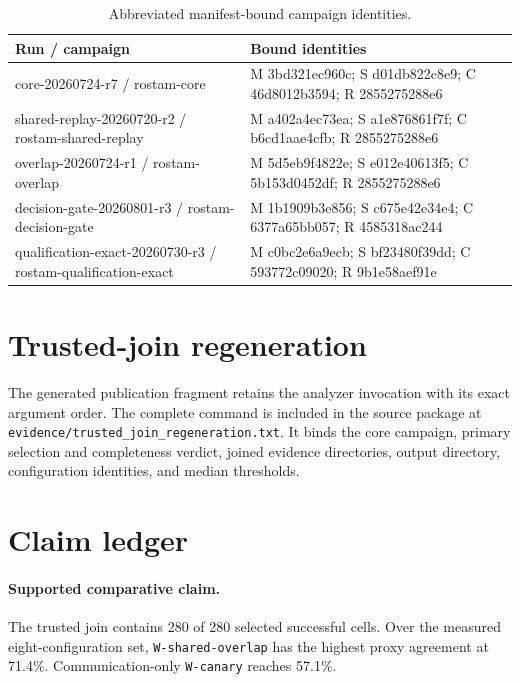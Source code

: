 \documentclass[10pt,twocolumn]{article}
\newcommand{\wname}[1]{\texttt{W-#1}}
\begin{document}
\begin{table}[h]
\caption{Abbreviated manifest-bound campaign identities.}
\label{tab:identities}
\centering\scriptsize
\begin{tabularx}{\columnwidth}{@{}p{}X@{}}
\toprule
Run / campaign & Bound identities \\
\midrule
core-20260724-r7 / rostam-core & M 3bd321ec960c; S d01db822c8e9; C 46d8012b3594; R 2855275288e6 \\
shared-replay-20260720-r2 / rostam-shared-replay & M a402a4ec73ea; S a1e876861f7f; C b6cd1aae4cfb; R 2855275288e6 \\
overlap-20260724-r1 / rostam-overlap & M 5d5eb9f4822e; S e012e40613f5; C 5b153d0452df; R 2855275288e6 \\
decision-gate-20260801-r3 / rostam-decision-gate & M 1b1909b3e856; S c675e42e34e4; C 6377a65bb057; R 4585318ac244 \\
qualification-exact-20260730-r3 / rostam-qualification-exact & M c0bc2e6a9ecb; S bf23480f39dd; C 593772c09020; R 9b1e58aef91e \\
\bottomrule
\end{tabularx}
\end{table}

\section{Trusted-join regeneration}

The generated publication fragment retains the analyzer invocation with its
exact argument order. The complete command is included in the source package
at \texttt{evidence/trusted\_join\_regeneration.txt}. It binds the core
campaign, primary selection and completeness verdict, joined evidence
directories, output directory, configuration identities, and median
thresholds.

\section{Claim ledger}

\paragraph{Supported comparative claim.} The trusted join contains 280 of 280
selected successful cells. Over the measured eight-configuration set,
\wname{shared-overlap} has the highest proxy agreement at 71.4\%.
Communication-only \wname{canary} reaches 57.1\%.
\end{document}
